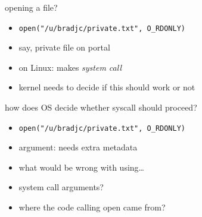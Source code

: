 \begin{frame}{opening a file?}
\begin{itemize}
\item \texttt{open("/u/bradjc/private.txt", O\_RDONLY)}
\item say, private file on portal
\vspace{.5cm}
\item on Linux: makes \textit{system call}
\item kernel needs to decide if this should work or not
\end{itemize}
\end{frame}



\begin{frame}{how does OS decide whether syscall should proceed?}
\begin{itemize}
\item \texttt{open("/u/bradjc/private.txt", O\_RDONLY)}
\item argument: needs extra metadata
\vspace{.5cm}
\item what would be wrong with using\ldots
\item system call arguments?
\item where the code calling open came from?
\end{itemize}
\end{frame}

